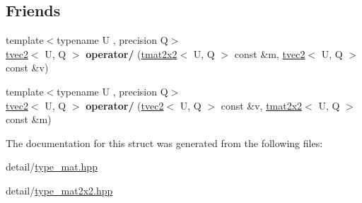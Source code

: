 \subsection*{Friends}
\begin{DoxyCompactItemize}
\item 
\hypertarget{structglm_1_1tmat2x2_a6d8b6618f8e231cea3dec1d6b21d7de3}{{\footnotesize template$<$typename U , precision Q$>$ }\\\hyperlink{structglm_1_1tvec2}{tvec2}$<$ U, Q $>$ {\bfseries operator/} (\hyperlink{structglm_1_1tmat2x2}{tmat2x2}$<$ U, Q $>$ const \&m, \hyperlink{structglm_1_1tvec2}{tvec2}$<$ U, Q $>$ const \&v)}\label{structglm_1_1tmat2x2_a6d8b6618f8e231cea3dec1d6b21d7de3}

\item 
\hypertarget{structglm_1_1tmat2x2_af5138f235b2448c769a37e7d222a5ab6}{{\footnotesize template$<$typename U , precision Q$>$ }\\\hyperlink{structglm_1_1tvec2}{tvec2}$<$ U, Q $>$ {\bfseries operator/} (\hyperlink{structglm_1_1tvec2}{tvec2}$<$ U, Q $>$ const \&v, \hyperlink{structglm_1_1tmat2x2}{tmat2x2}$<$ U, Q $>$ const \&m)}\label{structglm_1_1tmat2x2_af5138f235b2448c769a37e7d222a5ab6}

\end{DoxyCompactItemize}


The documentation for this struct was generated from the following files\-:\begin{DoxyCompactItemize}
\item 
detail/\hyperlink{type__mat_8hpp}{type\-\_\-mat.\-hpp}\item 
detail/\hyperlink{type__mat2x2_8hpp}{type\-\_\-mat2x2.\-hpp}\end{DoxyCompactItemize}
